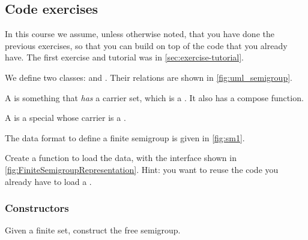 \subsection{Code exercises}

\begin{remark}
  In this course we assume, unless otherwise noted, that you have done the previous exercises, so that you can build on top of the code that you already have. The first exercise and tutorial was in \cref{sec:exercise-tutorial}.
\end{remark}

\begin{figure*}[b]\label{fig:uml_semigroup}
\end{figure*}

We define two classes: \Semigroup and \FiniteSemigroup.
Their relations are shown in \cref{fig:uml_semigroup}.

A \Semigroup is something that \emph{has} a carrier set, which is a \Setoid.
It also has a compose function.


A \FiniteSemigroup is a special \Semigroup whose carrier is a \FiniteSet.



The data format to define a finite semigroup is given in \cref{fig:sm1}.


\begin{gradedexercise}
  \label{ex:TestFiniteSemigroupRepresentation}
  Create a function to load the data, with the interface shown in \cref{fig:FiniteSemigroupRepresentation}.
  Hint: you want to reuse the code you already have to load a \FiniteSet.
\end{gradedexercise}


\begin{figure*}\label{fig:FiniteSemigroupRepresentation}
\end{figure*}

\subsubsection*{Constructors}

\begin{gradedexercise}
  \label{ex:FiniteSemigroupRepresentation}
  Given a finite set, construct the free semigroup.

\end{gradedexercise}
